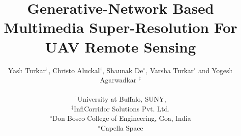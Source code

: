 \documentclass[conference]{IEEEtran}
\begin{document}
\title{Generative-Network Based Multimedia Super-Resolution For UAV
Remote Sensing\\
}

\author{
    Yash Turkar$^\dagger$, Christo Aluckal$^\ddagger$, Shaunak De$^\diamond$, Varsha Turkar$^\circ$ and Yogesh Agarwadkar $^\ddagger$\\\\
    $^\dagger$University at Buffalo, SUNY,\\ $^\ddagger$InfiCorridor Solutions Pvt. Ltd.\\ $^\circ$Don Bosco College of Engineering, Goa, India \\ $^\diamond$Capella Space
}

\end{document}
